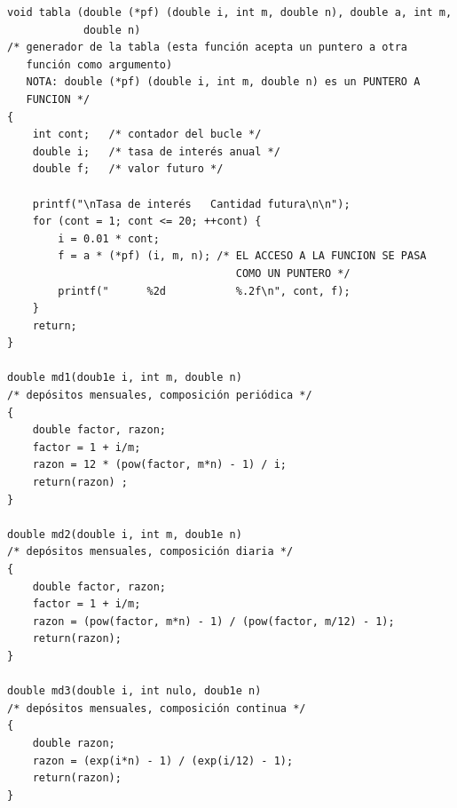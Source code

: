 \documentclass{article}
\begin{document}
\begin{verbatim}
void tabla (double (*pf) (double i, int m, double n), double a, int m,
            double n)
/* generador de la tabla (esta función acepta un puntero a otra
   función como argumento) 
   NOTA: double (*pf) (double i, int m, double n) es un PUNTERO A
   FUNCION */
{
    int cont;   /* contador del bucle */
    double i;   /* tasa de interés anual */
    double f;   /* valor futuro */

    printf("\nTasa de interés   Cantidad futura\n\n");
    for (cont = 1; cont <= 20; ++cont) {
        i = 0.01 * cont;
        f = a * (*pf) (i, m, n); /* EL ACCESO A LA FUNCION SE PASA
                                    COMO UN PUNTERO */
        printf("      %2d           %.2f\n", cont, f);
    }
    return;
}

double md1(doub1e i, int m, double n)
/* depósitos mensuales, composición periódica */
{
    double factor, razon;
    factor = 1 + i/m;
    razon = 12 * (pow(factor, m*n) - 1) / i;
    return(razon) ;
}

double md2(double i, int m, doub1e n)
/* depósitos mensuales, composición diaria */
{
    double factor, razon;
    factor = 1 + i/m;
    razon = (pow(factor, m*n) - 1) / (pow(factor, m/12) - 1);
    return(razon);
}

double md3(double i, int nulo, doub1e n)
/* depósitos mensuales, composición continua */
{
    double razon;
    razon = (exp(i*n) - 1) / (exp(i/12) - 1);
    return(razon);
}
\end{verbatim}
\end{document}

